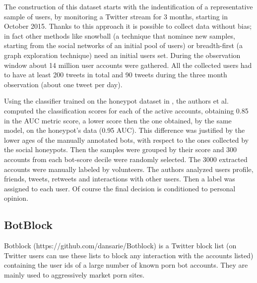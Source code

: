 The construction of this dataset starts with the indentification of a representative sample of users, by monitoring a Twitter stream for 3 months, starting in October 2015. Thanks to this approach it is possible to collect data without bias; in fact other methods like snowball (a technique that nominee new samples, starting from the social networks of an initial pool of users) or breadth-first (a graph exploration technique) need an initial users set.
During the observation window about 14 million user accounts were gathered. 
All the collected users had to have at least 200 tweets in total and 90 tweets during the three month observation (about one tweet per day).

Using the classifier trained on the honeypot dataset in \cite{Lee11sevenmonths}, the authors et al. \cite{Varol} computed the classification scores for each of the active accounts, obtaining 0.85 in the AUC metric score, a lower score then the one obtained, by the same model, on the honeypot's data (0.95 AUC). This difference was justified by the lower ages of the manually annotated bots, with respect to the ones collected by the social honeypots.
Then the samples were grouped by their score and 300 accounts from each bot-score decile were randomly selected. 
The 3000 extracted accounts were manually labeled by volunteers. The authors analyzed users profile, friends, tweets, retweets and interactions with other users. Then a label was assigned to each user.
Of course the final decision is conditioned to personal opinion.

\subsection{BotBlock}
Botblock (https://github.com/dansarie/Botblock) is a Twitter block list (on Twitter users can use these lists to block any interaction with the accounts listed) containing the user ids of a large number of known porn bot accounts. 
They are mainly used to aggressively market porn sites.

